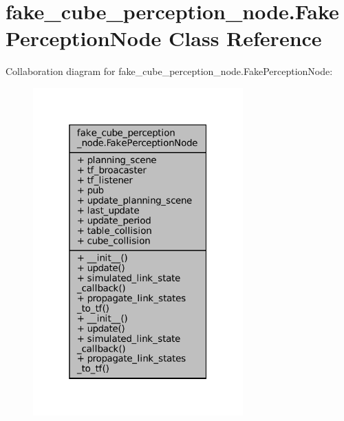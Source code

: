 \hypertarget{classfake__cube__perception__node_1_1FakePerceptionNode}{}\section{fake\+\_\+cube\+\_\+perception\+\_\+node.\+Fake\+Perception\+Node Class Reference}
\label{classfake__cube__perception__node_1_1FakePerceptionNode}


Collaboration diagram for fake\+\_\+cube\+\_\+perception\+\_\+node.\+Fake\+Perception\+Node\+:
\nopagebreak
\begin{figure}[H]
\begin{center}
\leavevmode
\includegraphics[width=229pt]{classfake__cube__perception__node_1_1FakePerceptionNode__coll__graph}
\end{center}
\end{figure}
